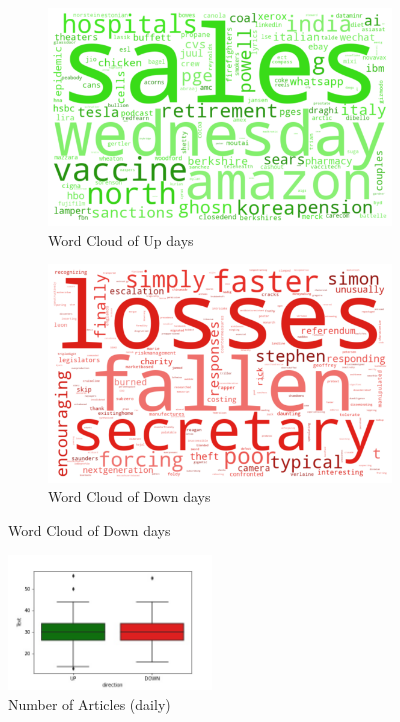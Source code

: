 \documentclass[a4paper, 12pt]{report}
\begin{document}
    \begin{figure}[H]
    \begin{subfigure}{.5\textwidth}
        \centering
        \includegraphics[width=1.0\linewidth]{graphs/upward_wordcloud1.png}
        \caption{Word Cloud of Up days}
    \end{subfigure}
    \begin{subfigure}{.5\textwidth}
        \centering
        \includegraphics[width=1.0\linewidth]{graphs/downward_wordcloud1.png}
        \caption{Word Cloud of Down days}
    \end{subfigure}
    \end{figure}
    
    \begin{figure}
        \begin{center}
            \includegraphics[width=0.48\textwidth]{graphs/dir_num1.jpg}
        \end{center}
        \caption{Number of Articles (daily)}
    \label{fig: dir}
    \end{figure}
    
\end{document}
